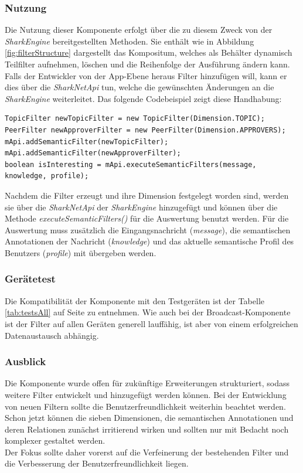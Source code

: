 \subsubsection{Nutzung}
Die Nutzung dieser Komponente erfolgt über die zu diesem Zweck von der \textit{SharkEngine} bereitgestellten Methoden. Sie enthält wie in Abbildung \ref{fig:filterStructure} dargestellt das Kompositum, welches als Behälter dynamisch Teilfilter aufnehmen, löschen und die Reihenfolge der Ausführung ändern kann. Falls der Entwickler von der App-Ebene heraus Filter hinzufügen will, kann er dies über die \textit{SharkNetApi} tun, welche die gewünschten Änderungen an die \textit{SharkEngine} weiterleitet. Das folgende Codebeispiel zeigt diese Handhabung:\\
 \lstset{language=Java, caption=Beispiel für die Anwendung der Filter, label=DescriptiveLabel, numbers=left, numbersep=1em, breaklines=true, basicstyle=\small}
 \begin{lstlisting}
TopicFilter newTopicFilter = new TopicFilter(Dimension.TOPIC);
PeerFilter newApproverFilter = new PeerFilter(Dimension.APPROVERS);
mApi.addSemanticFilter(newTopicFilter);
mApi.addSemanticFilter(newApproverFilter);
boolean isInteresting = mApi.executeSemanticFilters(message, knowledge, profile);
 \end{lstlisting}
Nachdem die Filter erzeugt und ihre Dimension festgelegt worden sind, werden sie über die \textit{SharkNetApi} der \textit{SharkEngine} hinzugefügt und können über die Methode \textit{executeSemanticFilters()} für die Auswertung benutzt werden. Für die Auswertung muss zusätzlich die Eingangsnachricht (\textit{message}), die semantischen Annotationen der Nachricht (\textit{knowledge}) und das aktuelle semantische Profil des Benutzers (\textit{profile}) mit übergeben werden.

\subsubsection{Gerätetest}
Die Kompatibilität der Komponente mit den Testgeräten ist der Tabelle \ref{tab:testsAll} auf Seite \pageref{tab:testsAll} zu entnehmen. Wie auch bei der Broadcast-Komponente ist der Filter auf allen Geräten generell lauffähig, ist aber von einem erfolgreichen Datenaustausch abhängig.

\subsubsection{Ausblick}
Die Komponente wurde offen für zukünftige Erweiterungen strukturiert, sodass weitere Filter entwickelt und hinzugefügt werden können. Bei der Entwicklung von neuen Filtern sollte die Benutzerfreundlichkeit weiterhin beachtet werden. Schon jetzt können die sieben Dimensionen, die semantischen Annotationen und deren Relationen zunächst irritierend wirken und sollten nur mit Bedacht noch komplexer gestaltet werden. 
\\Der Fokus sollte daher vorerst auf die Verfeinerung der bestehenden Filter und die Verbesserung der Benutzerfreundlichkeit liegen. 
\newpage
